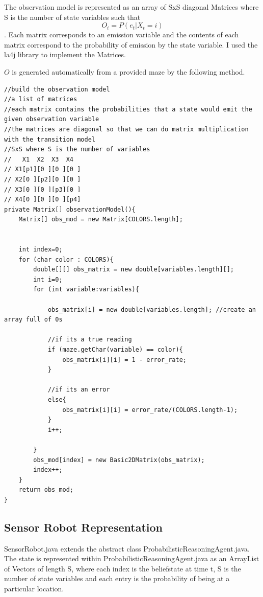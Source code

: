\documentclass[a4paper]{article}
\begin{document}
The observation model is represented as an array of SxS diagonal Matrices where S is the number of state variables such that
\begin{equation}
O_{i} = P(e_{t}|X_t = i)
\end{equation}. Each matrix corresponds to an emission variable and the contents of each matrix correspond to the probability of emission by the state variable.  I used the la4j library to implement the Matrices. 

$O$ is generated automatically from a provided maze by the following method.

\begin{lstlisting}
//build the observation model
//a list of matrices
//each matrix contains the probabilities that a state would emit the given observation variable
//the matrices are diagonal so that we can do matrix multiplication with the transition model
//SxS where S is the number of variables
//   X1  X2  X3  X4
// X1[p1][0 ][0 ][0 ]
// X2[0 ][p2][0 ][0 ]
// X3[0 ][0 ][p3][0 ]
// X4[0 ][0 ][0 ][p4]
private Matrix[] observationModel(){
	Matrix[] obs_mod = new Matrix[COLORS.length];
	
	
	int index=0;
	for (char color : COLORS){
		double[][] obs_matrix = new double[variables.length][];
		int i=0;
		for (int variable:variables){
			
			obs_matrix[i] = new double[variables.length]; //create an array full of 0s
			
			//if its a true reading
			if (maze.getChar(variable) == color){
				obs_matrix[i][i] = 1 - error_rate;
			}
			
			//if its an error
			else{
				obs_matrix[i][i] = error_rate/(COLORS.length-1);
			}
			i++;
			
		}
		obs_mod[index] = new Basic2DMatrix(obs_matrix);
		index++;
	}
	return obs_mod;
}
\end{lstlisting}

\subsection{Sensor Robot Representation}

SensorRobot.java extends the abstract class ProbabilisticReasoningAgent.java. The state is represented within ProbabilisticReasoningAgent.java as an ArrayList of Vectors of length S, where each index is the beliefstate at time t, S is the number of state variables and each entry is the probability of being at a particular location.
\end{document}
